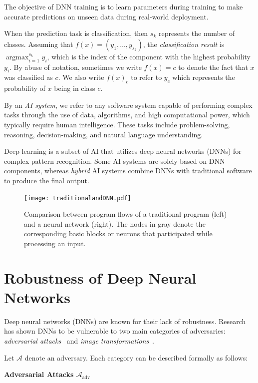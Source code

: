 The objective of DNN training is to learn parameters during training to make accurate predictions on unseen data during real-world deployment.

When the prediction task is classification, then $s_k$ represents the number of classes. Assuming that $f(x) = (y_1,\dots,y_{s_k})$, the \emph{classification result} is $\displaystyle\mathop{\text{argmax}}_{i=1}^{s_k} y_i$, which is the index of the component with the highest probability $y_i$. By abuse of notation, sometimes we write $f(x)=c$ to denote the fact that $x$ was classified as $c$. We also write $f(x)_c$ to refer to $y_c$ which represents the probability of $x$ being in class $c$.

By an \emph{AI system}, we refer to any software system capable of performing complex tasks through the use of data, algorithms, and high computational power, which typically require human intelligence. These tasks include problem-solving, reasoning, decision-making, and natural language understanding.

Deep learning is a subset of AI that utilizes deep neural networks (DNNs) for complex pattern recognition. Some AI systems are solely based on DNN components, whereas \emph{hybrid} AI systems combine DNNs with traditional software to produce the final output.

\begin{figure}
    \centering
    \texttt{[image: traditionalandDNN.pdf]}
    \caption{Comparison between program flows of a traditional program (left) and a neural network (right). The nodes in gray denote the corresponding basic blocks or neurons that participated while processing an input.}
    \label{fig:graph}
\end{figure}

\section{Robustness of Deep Neural Networks}

Deep neural networks (DNNs) are known for their lack of robustness. Research has shown DNNs to be vulnerable to two main categories of adversaries: \emph{adversarial attacks}~\cite{adv_attacks} and \emph{image transformations}~\cite{deeptest}.

Let $\mathcal{A}$ denote an adversary. Each category can be described formally as follows:

\smallskip\noindent%
\textbf{Adversarial Attacks $\mathcal{A}_{\text{adv}}$}

